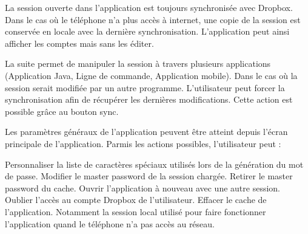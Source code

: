 \begin{center}
	\begin{minipage}{.3\textwidth}
	\end{minipage}
	\begin{minipage}{.3\textwidth}
	\end{minipage}
\end{center}

La session ouverte dans l'application est toujours synchronisée avec Dropbox. Dans le cas où le téléphone n'a plus accès à internet, une copie de la session est conservée en locale avec la dernière synchronisation. L'application peut ainsi afficher les comptes mais sans les éditer.

\begin{center}
	\begin{minipage}{.3\textwidth}
	\end{minipage}
	\begin{minipage}{.3\textwidth}
	\end{minipage}
	\begin{minipage}{.3\textwidth}
	\end{minipage}        
\end{center}

La suite \easypass{} permet de manipuler la session à travers plusieurs applications (Application Java, Ligne de commande, Application mobile). Dans le cas où la session serait modifiée par un autre programme. L'utilisateur peut forcer la synchronisation afin de récupérer les dernières modifications. Cette action est possible grâce au bouton sync.


Les paramètres généraux de l'application peuvent être atteint depuis l'écran principale de l'application. Parmis les actions possibles, l'utilisateur peut :

Personnaliser la liste de caractères spéciaux utilisés lors de la génération du mot de passe. 
Modifier le master password de la session chargée.
Retirer le master password du cache.
Ouvrir l'application à nouveau avec une autre session.
Oublier l'accès au compte Dropbox de l'utilisateur.
Effacer le cache de l'application. Notamment la session local utilisé pour faire fonctionner l'application quand le téléphone n'a pas accès au réseau.

